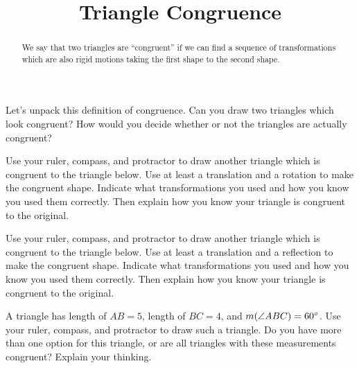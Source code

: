 \documentclass[noauthor, nooutcomes, handout]{ximera}
\title{Triangle Congruence}
\begin{document}
\begin{abstract} We say that two triangles are ``congruent'' if we can find a sequence of transformations which are also rigid motions taking the first shape to the second shape. \end{abstract}
\maketitle

\begin{problem}
Let's unpack this definition of congruence. Can you draw two triangles which look congruent? How would you decide whether or not the triangles are actually congruent?
\end{problem} \vskip 0.5in

\begin{problem}
Use your ruler, compass, and protractor to draw another triangle which is congruent to the triangle below. Use at least a translation and a rotation to make the congruent shape. Indicate what transformations you used and how you know you used them correctly. Then explain how you know your triangle is congruent to the original.
\begin{center}
\end{center}
\end{problem} \vfill


\begin{problem}
Use your ruler, compass, and protractor to draw another triangle which is congruent to the triangle below. Use at least a translation and a reflection to make the congruent shape. Indicate what transformations you used and how you know you used them correctly. Then explain how you know your triangle is congruent to the original.
\begin{center}
\end{center}
\end{problem} \vfill

\newpage

\begin{problem}
A triangle has length of $AB = 5$, length of $BC = 4$, and $m(\angle ABC) = 60\degree$. Use your ruler, compass, and protractor to draw such a triangle. Do you have more than one option for this triangle, or are all triangles with these measurements congruent? Explain your thinking.
\end{problem} \vfill
\end{document}
